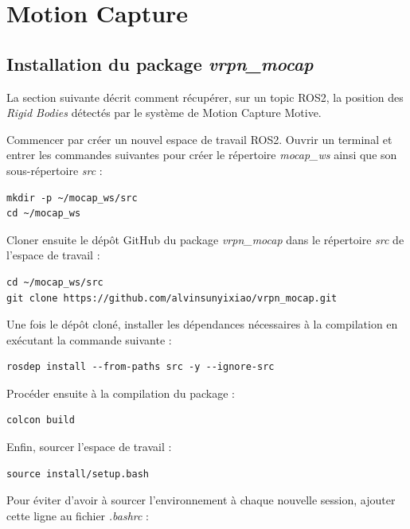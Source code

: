 \chapter{Motion Capture}
\label{section_mocap}

\section{Installation du package \textit{vrpn\_mocap}}

La section suivante décrit comment récupérer, sur un topic ROS2, la position des \textit{Rigid Bodies} détectés par le système de Motion Capture Motive.

Commencer par créer un nouvel espace de travail ROS2. Ouvrir un terminal et entrer les commandes suivantes pour créer le répertoire \textit{mocap\_ws} ainsi que son sous-répertoire \textit{src} :

\begin{lstlisting}[style=commandstyle]
mkdir -p ~/mocap_ws/src
cd ~/mocap_ws
\end{lstlisting}

\noindent Cloner ensuite le dépôt GitHub du package \textit{vrpn\_mocap} dans le répertoire \textit{src} de l’espace de travail :

\begin{lstlisting}[style=commandstyle]
cd ~/mocap_ws/src
git clone https://github.com/alvinsunyixiao/vrpn_mocap.git
\end{lstlisting}

\noindent Une fois le dépôt cloné, installer les dépendances nécessaires à la compilation en exécutant la commande suivante :

\begin{lstlisting}[style=commandstyle]
rosdep install --from-paths src -y --ignore-src
\end{lstlisting}

\noindent Procéder ensuite à la compilation du package :

\begin{lstlisting}[style=commandstyle]
colcon build
\end{lstlisting}

\noindent Enfin, sourcer l’espace de travail :

\begin{lstlisting}[style=commandstyle]
source install/setup.bash
\end{lstlisting}

Pour éviter d’avoir à sourcer l’environnement à chaque nouvelle session, ajouter cette ligne au fichier \textit{.bashrc} :


